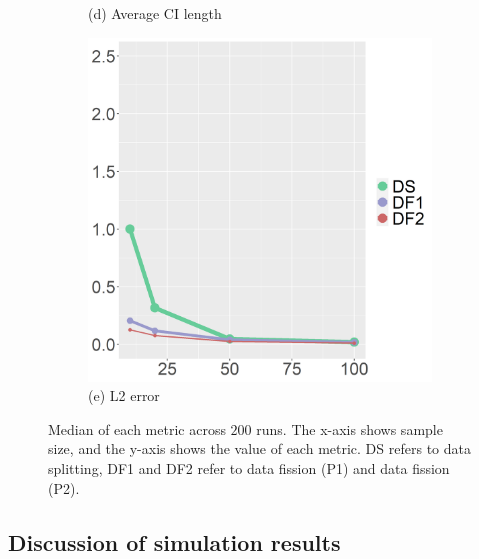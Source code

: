 \begin{figure}[ht!]
\begin{subfigure}[b]{.32\columnwidth}
    \caption{(d) Average CI length}
    \label{fig:ci}
\end{subfigure}
\hfill
\centering
\begin{subfigure}[b]{.32\columnwidth} 
    \includegraphics[width=\columnwidth]{../../plot/L2_1.png}
    \caption{(e) L2 error}
    \label{fig:l2}
\end{subfigure}
\hfill
\caption{Median of each metric across $200$ runs. The x-axis shows sample size, and the y-axis shows the value of each metric. DS refers to data splitting, DF1 and DF2 refer to data fission (P1) and data fission (P2).}
\label{fig:median}
\end{figure}

\subsection{Discussion of simulation results}

